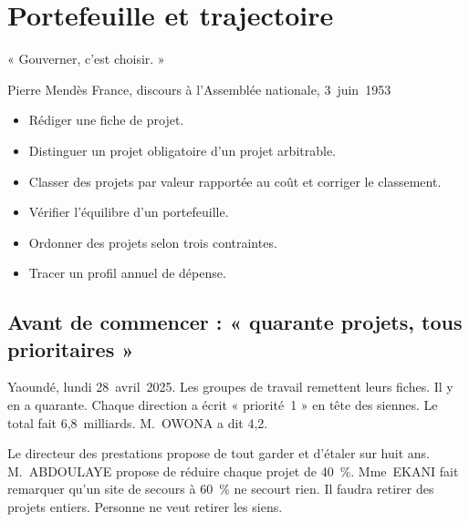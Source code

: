 
\chapter{Portefeuille et trajectoire}
\label{chap:portefeuille}

\epigraph{%
    « Gouverner, c'est choisir. »%
}{Pierre Mendès France, discours à l'Assemblée nationale, 3~juin~1953}


\begin{boxobjectifs}
\begin{itemize}
    \item Rédiger une fiche de projet.
    \item Distinguer un projet obligatoire d'un projet arbitrable.
    \item Classer des projets par valeur rapportée au coût et corriger le classement.
    \item Vérifier l'équilibre d'un portefeuille.
    \item Ordonner des projets selon trois contraintes.
    \item Tracer un profil annuel de dépense.
\end{itemize}
\end{boxobjectifs}

\bigskip

\section*{Avant de commencer : « quarante projets, tous prioritaires »}

Yaoundé, lundi 28~avril~2025. Les groupes de travail remettent leurs fiches. Il y en a quarante. Chaque
direction a écrit « priorité~1 » en tête des siennes. Le total fait 6,8~milliards. M.~OWONA a dit 4,2.

Le directeur des prestations propose de tout garder et d'étaler sur huit ans. M.~ABDOULAYE propose de réduire
chaque projet de 40~\%. Mme~EKANI fait remarquer qu'un site de secours à 60~\% ne secourt rien. Il faudra
retirer des projets entiers. Personne ne veut retirer les siens.

